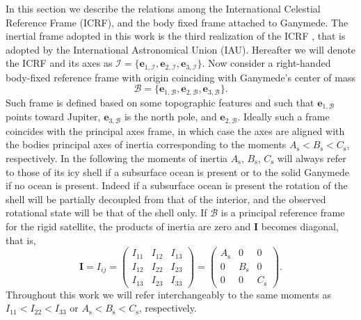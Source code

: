 \documentclass[lineno, pdflatex,sn-mathphys-ay]{sn-jnl}
\theoremstyle{thmstyleone}%
\theoremstyle{thmstyletwo}%
\theoremstyle{thmstylethree}%
\renewcommand{\vec}[1]{\boldsymbol{#1}}
\begin{document}
In this section we describe the relations among the International Celestial Reference Frame (ICRF), and the body fixed frame attached to Ganymede.
%
The inertial frame adopted in this work is the third realization of the ICRF \citep{2020A&A...644A.159C},  that is adopted by the International Astronomical Union (IAU). 
Hereafter we will denote the ICRF and its axes as ${\mathcal{I} = 
\{\vec{e}_{1,\mathcal{I}},\vec{e}_{2,\mathcal{I}},\vec{e}_{3,\mathcal{I}}\}}$.
%
Now consider a right-handed body-fixed reference frame with origin coinciding with Ganymede's center of mass
\begin{equation}
{\mathcal{B} = 
\{\vec{e}_{1,\mathcal{B}},\vec{e}_{2,\mathcal{B}},\vec{e}_{3,\mathcal{B}}\}}.
\end{equation}
Such frame is defined based on some topographic features and such that $\vec{e}_{1,\mathcal{B}}$ points toward Jupiter, $\vec{e}_{3,\mathcal{B}}$ is the north pole, and $\vec{e}_{2,\mathcal{B}}$. Ideally such a frame coincides with the principal axes frame, in which case the axes are aligned with the bodies principal axes of inertia corresponding to the moments ${A_\mathrm{s} < B_\mathrm{s} < C_\mathrm{s}}$, respectively. 
In the following the moments of inertia $A_\mathrm{s}$, $B_\mathrm{s}$, $C_\mathrm{s}$ will always refer to those of its icy shell if a subsurface ocean is present or to the solid Ganymede if no ocean is present. Indeed if a subsurface ocean is present the rotation of the shell will be partially decoupled from that of the interior, and the observed rotational state will be that of the shell only.
%
If $\mathcal{B}$ is a principal reference frame for the rigid satellite, the products of inertia are zero and $\vec{I}$ becomes diagonal, that is,
%
\begin{equation}
	\vec{I} = 
	I_{ij} = 
	\begin{pmatrix}
		I_{11} & I_{12} & I_{13} \\
		I_{12} & I_{22} & I_{23} \\
		I_{13} & I_{23} & I_{33}
	\end{pmatrix}
	=
	\begin{pmatrix}
		A_\mathrm{s} & 0 & 0 \\
		0 & B_\mathrm{s} & 0 \\
		0 & 0 & C_\mathrm{s}
	\end{pmatrix}.
\end{equation}
%
Throughout this work we will refer interchangeably to the same moments as ${I_{11} < I_{22} < I_{33}}$ or ${A_\mathrm{s} < B_\mathrm{s} < C_\mathrm{s}}$, respectively.
\end{document}
